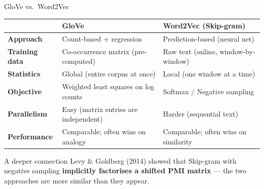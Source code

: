 \documentclass[11pt,aspectratio=169,professionalfonts]{beamer}
\begin{document}
\begin{frame}{GloVe vs.\ Word2Vec}
  \centering
  \small
  \begin{tabular}{l l l}
    \toprule
    & \textbf{GloVe} & \textbf{Word2Vec (Skip-gram)} \\
    \midrule
    \textbf{Approach}     & Count-based + regression    & Prediction-based (neural net) \\
    \textbf{Training data}& Co-occurrence matrix (pre-computed) & Raw text (online, window-by-window) \\
    \textbf{Statistics}   & Global (entire corpus at once) & Local (one window at a time) \\
    \textbf{Objective}    & Weighted least squares on log counts & Softmax / Negative sampling \\
    \textbf{Parallelism}  & Easy (matrix entries are independent) & Harder (sequential text) \\
    \textbf{Performance}  & Comparable; often wins on analogy & Comparable; often wins on similarity \\
    \bottomrule
  \end{tabular}

  \vspace{8pt}
  \begin{block}{A deeper connection}
    Levy \& Goldberg (2014) showed that Skip-gram with negative sampling \textbf{implicitly factorises a shifted PMI matrix} --- the two approaches are more similar than they appear.
  \end{block}
\end{frame}
%
%
\end{document}

